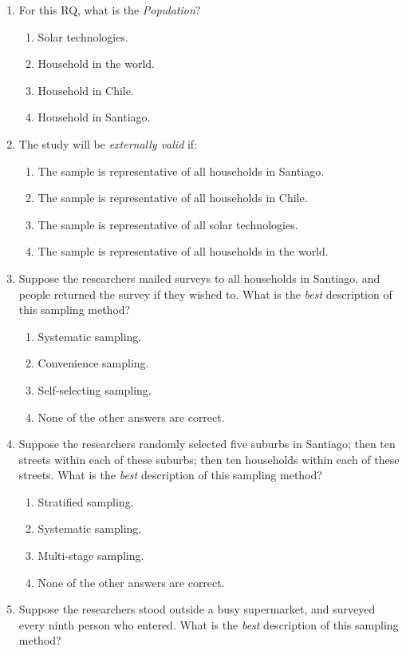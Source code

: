 \documentclass[
  11pt,
  a4paper,
  krantz2]{krantz}
\providecommand{\tightlist}{%
  \setlength{\itemsep}{0pt}\setlength{\parskip}{0pt}}
\begin{document}
\begin{enumerate}
\def\labelenumi{\arabic{enumi}.}
\tightlist
\item
  For this RQ, what is the \emph{Population}? \tightlist

  \begin{enumerate}
  \def\labelenumii{\alph{enumii}.}
  \tightlist
  \item
    Solar technologies.
  \item
    Household in the world.
  \item
    Household in Chile.
  \item
    Household in Santiago.
  \end{enumerate}
\item
  The study will be \emph{externally valid} if:

  \begin{enumerate}
  \def\labelenumii{\alph{enumii}.}
  \tightlist
  \item
    The sample is representative of all households in Santiago.
  \item
    The sample is representative of all households in Chile.
  \item
    The sample is representative of all solar technologies.
  \item
    The sample is representative of all households in the world.
  \end{enumerate}
\item
  Suppose the researchers mailed surveys to all households in Santiago, and people returned the survey if they wished to.
  What is the \emph{best} description of this sampling method?

  \begin{enumerate}
  \def\labelenumii{\alph{enumii}.}
  \tightlist
  \item
    Systematic sampling.
  \item
    Convenience sampling.
  \item
    Self-selecting sampling.
  \item
    None of the other answers are correct.
  \end{enumerate}
\item
  Suppose the researchers randomly selected five suburbs in Santiago; then ten streets within each of these suburbs; then ten households within each of these streets.
  What is the \emph{best} description of this sampling method?

  \begin{enumerate}
  \def\labelenumii{\alph{enumii}.}
  \tightlist
  \item
    Stratified sampling.
  \item
    Systematic sampling.
  \item
    Multi-stage sampling.
  \item
    None of the other answers are correct.
  \end{enumerate}
\item
  Suppose the researchers stood outside a busy supermarket, and surveyed every ninth person who entered.
  What is the \emph{best} description of this sampling method?


\end{enumerate}
\end{document}
